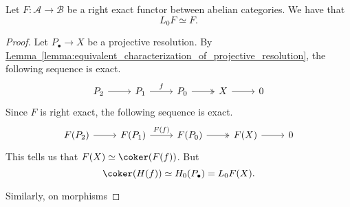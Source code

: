 \documentclass[main.tex]{subfiles}
\begin{document}
\begin{proposition}
  Let $F\colon \mathcal{A} \to \mathcal{B}$ be a right exact functor between abelian categories. We have that
  \begin{equation*}
    L_{0}F \simeq F.
  \end{equation*}
\end{proposition}
\begin{proof}
  Let $P_{\bullet} \to X$ be a projective resolution. By \hyperref[lemma:equivalent_characterization_of_projective_resolution]{Lemma~\ref*{lemma:equivalent_characterization_of_projective_resolution}}, the following sequence is exact.
  \begin{equation*}
    \begin{tikzcd}
      P_{2}
      \arrow[r]
      & P_{1}
      \arrow[r, "f"]
      & P_{0}
      \arrow[r, twoheadrightarrow]
      & X
      \arrow[r]
      & 0
    \end{tikzcd}
  \end{equation*}
  Since $F$ is right exact, the following sequence is exact.
  \begin{equation*}
    \begin{tikzcd}
      F(P_{2})
      \arrow[r]
      & F(P_{1})
      \arrow[r, "F(f)"]
      & F(P_{0})
      \arrow[r, twoheadrightarrow]
      & F(X)
      \arrow[r]
      & 0
    \end{tikzcd}
  \end{equation*}
  This tells us that $F(X) \simeq \coker(F(f))$. But
  \begin{equation*}
    \coker(H(f)) \simeq H_{0}(P_{\bullet}) = L_{0}F(X).
  \end{equation*}

  Similarly, on morphisms
\end{proof}
\end{document}
